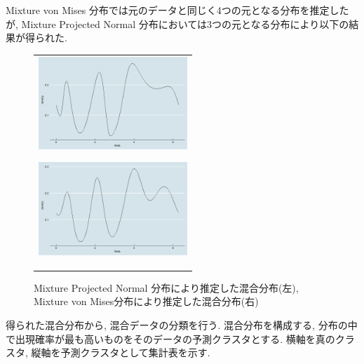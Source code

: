 \documentclass[a4j,11pt]{jarticle}
\begin{document}
Mixture von Mises 分布では元のデータと同じく4つの元となる分布を推定したが, Mixture Projected Normal 分布においては3つの元となる分布により以下の結果が得られた.

\begin{figure}[h]
 \begin{tabular}{c}
\hspace{0.5cm}
 \begin{minipage}{0.5\hsize}
  \begin{center}
   \includegraphics[clip,height= 35mm]{data/mix_pn.png}
  \end{center}
  \label{pnmix}
 \end{minipage}
\hspace{-1.0cm}
 \begin{minipage}{0.5\hsize}
  \begin{center}
   \includegraphics[clip,height= 35mm]{data/mix_von.png}
  \end{center}
  \label{vonmix}
 \end{minipage}
  \end{tabular}
\caption{Mixture Projected Normal 分布により推定した混合分布(左), Mixture von Mises分布により推定した混合分布(右)}
\end{figure}


得られた混合分布から, 混合データの分類を行う. 混合分布を構成する, 分布の中で出現確率が最も高いものをそのデータの予測クラスタとする.
横軸を真のクラスタ, 縦軸を予測クラスタとして集計表を示す. 
\end{document}
